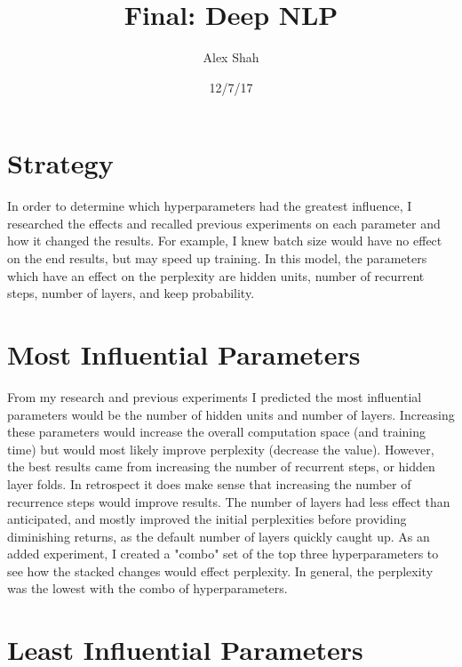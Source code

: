 \documentclass[10pt,a4paper]{article}
\begin{document}
\title{Final: Deep NLP}
\author{Alex Shah}
\date{12/7/17}

\maketitle

\section{Strategy}

In order to determine which hyperparameters had the greatest influence, I researched the effects and recalled previous experiments on each parameter and how it changed the results. For example, I knew batch size would have no effect on the end results, but may speed up training. In this model, the parameters which have an effect on the perplexity are hidden units, number of recurrent steps, number of layers, and keep probability.

\section{Most Influential Parameters}

From my research and previous experiments I predicted the most influential parameters would be the number of hidden units and number of layers. Increasing these parameters would increase the overall computation space (and training time) but would most likely improve perplexity (decrease the value). However, the best results came from increasing the number of recurrent steps, or hidden layer folds. In retrospect it does make sense that increasing the number of recurrence steps would improve results. The number of layers had less effect than anticipated, and mostly improved the initial perplexities before providing diminishing returns, as the default number of layers quickly caught up. As an added experiment, I created a "combo" set of the top three hyperparameters to see how the stacked changes would effect perplexity. In general, the perplexity was the lowest with the combo of hyperparameters.

\section{Least Influential Parameters}
\end{document}
